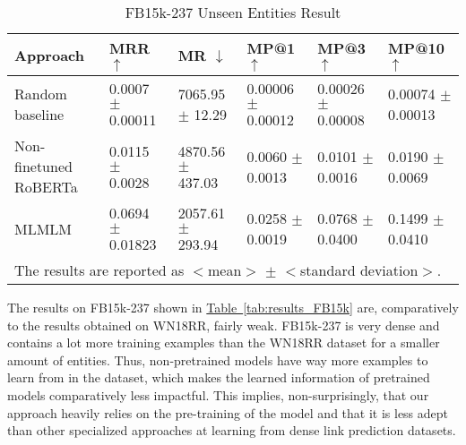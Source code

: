 \documentclass[11pt,a4paper]{article}
\newcommand{\RefTable}[1]{\hyperref[#1]{Table~\ref{#1}}}
\newcommand{\TableW}[3]{\begin{table*}[h!]
\begin{center}
  \caption{#3} 
  \vspace{-0.25\baselineskip}
  \label{#2}
  #1
\end{center}
\end{table*}}
\begin{document}
\TableW{\begin{tabular}{m{}m{}m{0.1\textwidth}m{0.1\textwidth}m{0.1\textwidth}m{0.1\textwidth}}
    \toprule
    Approach & MRR $\uparrow$ & MR $\downarrow$ & MP@1 $\uparrow$ & MP@3 $\uparrow$ & MP@10 $\uparrow$\\
    \midrule 
    Random baseline & 
        \shortstack[l]{{0.0007}\\{\small$\pm$ 0.00011}} &
        \shortstack[l]{{7065.95}\\{\small$\pm$ 12.29}} &
        \shortstack[l]{{0.00006}\\{\small$\pm$ 0.00012}} &
        \shortstack[l]{{0.00026}\\{\small$\pm$ 0.00008}} &
        \shortstack[l]{{0.00074}\\{\small$\pm$ 0.00013}}\\
    Non-finetuned RoBERTa & 
        \shortstack[l]{{0.0115}\\{\small$\pm$ 0.0028}} &
        \shortstack[l]{{4870.56}\\{\small$\pm$ 437.03}} &
        \shortstack[l]{{0.0060}\\{\small$\pm$ 0.0013}} &
        \shortstack[l]{{0.0101}\\{\small$\pm$ 0.0016}} &
        \shortstack[l]{{0.0190}\\{\small$\pm$ 0.0069}}\\
    MLMLM & 
        \shortstack[l]{{0.0694}\\{\small$\pm$ 0.01823}} &
        \shortstack[l]{{2057.61}\\{\small$\pm$ 293.94}} &
        \shortstack[l]{{0.0258}\\{\small$\pm$ 0.0019}} &
        \shortstack[l]{{0.0768}\\{\small$\pm$ 0.0400}} &
        \shortstack[l]{{0.1499}\\{\small$\pm$ 0.0410}}\\
    \bottomrule
    \multicolumn{6}{p{.8\textwidth}}{\small The results are reported as $<$mean$>$ $\pm$ $<$standard deviation$>$.}
  \end{tabular}}
{tab:results4}
{FB15k-237 Unseen Entities Result}

The results on FB15k-237 shown in \RefTable{tab:results_FB15k} are, comparatively to the results obtained on WN18RR, fairly weak.
FB15k-237 is very dense and contains a lot more training examples than the WN18RR dataset for a smaller amount of entities.
Thus, non-pretrained models have way more examples to learn from in the dataset, which makes the learned information of pretrained models comparatively less impactful.
This implies, non-surprisingly, that our approach heavily relies on the pre-training of the model and that it is less adept than other specialized approaches at learning from dense link prediction datasets.
\end{document}
